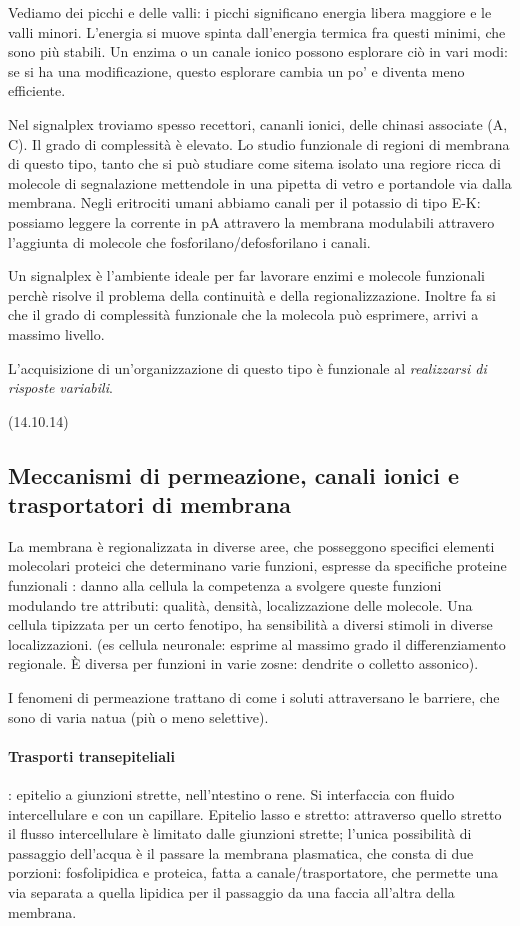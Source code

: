 \documentclass[a4paper,12pt]{article}
\begin{document}
Vediamo dei picchi e delle valli: i picchi significano energia libera maggiore e le valli minori. L'energia si muove spinta dall'energia termica fra questi minimi, che sono più stabili. Un enzima o un canale ionico possono esplorare ciò in vari modi: se si ha una modificazione, questo esplorare cambia un po' e diventa meno efficiente.

Nel signalplex troviamo spesso recettori, cananli ionici, delle chinasi associate (A, C). Il grado di complessità è elevato. Lo studio funzionale di regioni di membrana di questo tipo, tanto che si può studiare come sitema isolato una regiore ricca di molecole di segnalazione mettendole in una pipetta di vetro e portandole via dalla membrana. Negli eritrociti umani abbiamo canali per il potassio di tipo E-K: possiamo leggere la corrente in pA attravero la membrana modulabili attravero l'aggiunta di molecole che fosforilano/defosforilano i canali.

Un signalplex è l'ambiente ideale per far lavorare enzimi e molecole funzionali perchè risolve il problema della continuità e della regionalizzazione. Inoltre fa si che il grado di complessità funzionale che la molecola può esprimere, arrivi a massimo livello.

L'acquisizione di un'organizzazione di questo tipo è funzionale al \emph{realizzarsi di risposte variabili}.

(14.10.14)
\subsection{Meccanismi di permeazione, canali ionici e trasportatori di membrana}

La membrana è regionalizzata in diverse aree, che posseggono specifici elementi molecolari proteici che determinano varie funzioni, espresse da specifiche proteine funzionali : danno alla cellula la competenza a svolgere queste funzioni modulando tre attributi: qualità, densità, localizzazione delle molecole.
Una cellula tipizzata per un certo fenotipo, ha sensibilità a diversi stimoli in diverse localizzazioni. (es cellula neuronale: esprime al massimo grado il differenziamento regionale. È diversa per funzioni in varie zosne: dendrite o colletto assonico). 

I fenomeni di permeazione trattano di come i soluti attraversano le barriere, che sono di varia natua (più o meno selettive).

\paragraph{Trasporti transepiteliali}: epitelio a giunzioni strette, nell'ntestino o rene. Si interfaccia con fluido intercellulare e con un capillare. Epitelio lasso e stretto: attraverso quello stretto il flusso intercellulare è limitato dalle giunzioni strette; l'unica possibilità di passaggio dell'acqua è il passare la membrana plasmatica, che consta di due porzioni: fosfolipidica e proteica, fatta a canale/trasportatore, che permette una via separata a quella lipidica per il passaggio da una faccia all'altra della membrana.
\end{document}
